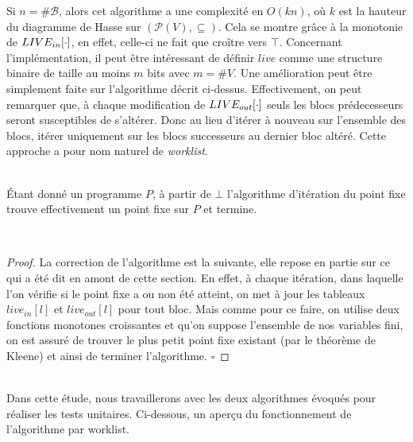 \documentclass[a4paper, 12pt]{article}
\begin{document}
Si $n = \#\mathcal{B}$, alors cet algorithme a une complexité en $O(kn)$, où $k$ est la hauteur du diagramme
de Hasse sur $(\mathcal{P}(V), \subseteq)$. Cela se montre grâce à la monotonie de $LIVE_{in}[\cdot]$, en effet,
celle-ci ne fait que croître vers $\top$.
Concernant l'implémentation, il peut être intéressant de définir $live$ comme une structure binaire de taille au
moins $m$ bits avec $m = \#V$.
Une amélioration peut être simplement faite sur l'algorithme décrit ci-dessus. Effectivement, on peut remarquer que,
à chaque modification de $LIVE_{out}[\cdot]$ seuls les blocs prédecesseurs seront susceptibles de s'altérer. Donc
au lieu d'itérer à nouveau sur l'ensemble des blocs, itérer uniquement sur les blocs successeurs au dernier
bloc altéré. Cette approche a pour nom naturel de \textit{worklist}.
\\
\\
\begin{lemma}
	Étant donné un programme $P$, à partir de $\bot$ l'algorithme d'itération du point fixe trouve effectivement
	un point fixe sur $P$ et termine.
\end{lemma}
\\
\begin{proof}
La correction de l'algorithme est la suivante, elle repose en partie sur ce qui a été dit en amont de cette section.
En effet, à chaque itération, dans laquelle l'on vérifie si le point fixe a ou non été atteint, on met à jour les
tableaux $live_{in}[l]$ et $live_{out}[l]$ pour tout bloc. Mais comme pour ce faire, on utilise deux fonctions monotones croissantes et qu'on suppose
l'ensemble de nos variables fini, on est assuré de trouver le plus petit point fixe existant (par le théorème de Kleene) et ainsi de terminer l'algorithme.
\hfill$\square$
\end{proof}
\\
Dans cette étude, nous travaillerons avec les deux algorithmes évoqués pour réaliser les tests unitaires. Ci-dessous, un aperçu du fonctionnement
de l'algorithme par worklist.
\end{document}
